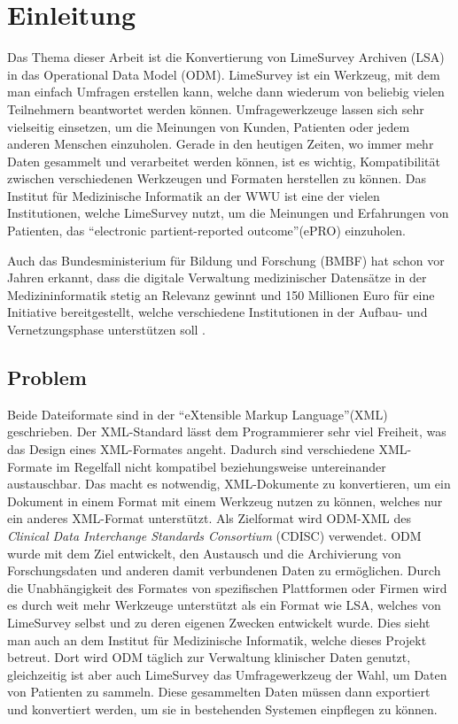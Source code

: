 \chapter{Einleitung}
\label{ch:einleitung}

Das Thema dieser Arbeit ist die Konvertierung von LimeSurvey Archiven (LSA) in das Operational Data Model (ODM).
LimeSurvey ist ein Werkzeug, mit dem man einfach Umfragen erstellen kann, welche dann wiederum von beliebig vielen Teilnehmern beantwortet werden können.
Umfragewerkzeuge lassen sich sehr vielseitig einsetzen, um die Meinungen von Kunden, Patienten oder jedem anderen Menschen einzuholen.
Gerade in den heutigen Zeiten, wo immer mehr Daten gesammelt und verarbeitet werden können, ist es wichtig, Kompatibilität zwischen verschiedenen Werkzeugen und Formaten herstellen zu können.
Das Institut für Medizinische Informatik an der WWU ist eine der vielen Institutionen, welche LimeSurvey nutzt, um die Meinungen und Erfahrungen von Patienten, das \enquote{electronic partient-reported outcome}(ePRO) einzuholen.

Auch das Bundesministerium für Bildung und Forschung (BMBF) hat schon vor Jahren erkannt, dass die digitale Verwaltung medizinischer Datensätze in der Medizininformatik stetig an Relevanz gewinnt und 150 Millionen Euro für eine Initiative bereitgestellt, welche verschiedene Institutionen in der Aufbau- und Vernetzungsphase unterstützen soll \cite{bmbf_medinfo}.

\section{Problem}
Beide Dateiformate sind in der \enquote{eXtensible Markup Language}(XML) geschrieben.
Der XML-Standard lässt dem Programmierer sehr viel Freiheit, was das Design eines XML-Formates angeht. Dadurch sind verschiedene XML-Formate im Regelfall nicht kompatibel beziehungsweise untereinander austauschbar.
Das macht es notwendig, XML-Dokumente zu konvertieren, um ein Dokument in einem Format mit einem Werkzeug nutzen zu können, welches nur ein anderes XML-Format unterstützt.
Als Zielformat wird ODM-XML des \textit{Clinical Data Interchange Standards Consortium} (CDISC) verwendet.
ODM wurde mit dem Ziel entwickelt, den Austausch und die Archivierung von Forschungsdaten und anderen damit verbundenen Daten zu ermöglichen.
Durch die Unabhängigkeit des Formates von spezifischen Plattformen oder Firmen wird es durch weit mehr Werkzeuge unterstützt als ein Format wie LSA, welches von LimeSurvey selbst und zu deren eigenen Zwecken entwickelt wurde.
Dies sieht man auch an dem Institut für Medizinische Informatik, welche dieses Projekt betreut.
Dort wird ODM täglich zur Verwaltung klinischer Daten genutzt, gleichzeitig ist aber auch LimeSurvey das Umfragewerkzeug der Wahl, um Daten von Patienten zu sammeln.
Diese gesammelten Daten müssen dann exportiert und konvertiert werden, um sie in bestehenden Systemen einpflegen zu können.

